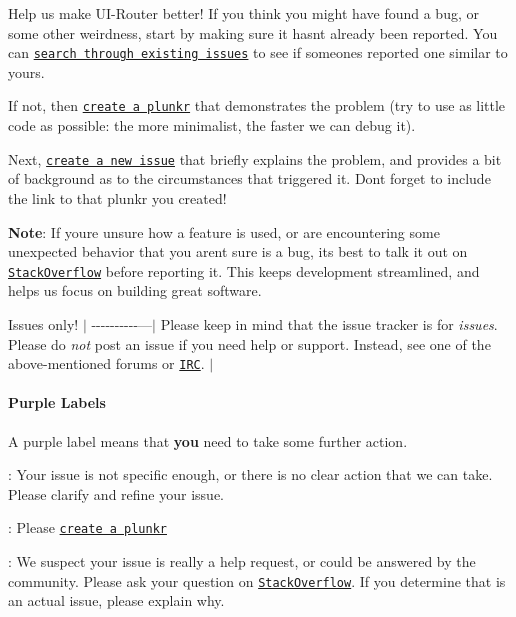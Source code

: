 Help us make U\+I-\/\+Router better! If you think you might have found a bug, or some other weirdness, start by making sure it hasn\textquotesingle{}t already been reported. You can \href{https://github.com/angular-ui/ui-router/search?q=wat%3F&type=Issues}{\tt search through existing issues} to see if someone\textquotesingle{}s reported one similar to yours.

If not, then \href{http://bit.ly/UIR-Plunk}{\tt create a plunkr} that demonstrates the problem (try to use as little code as possible\+: the more minimalist, the faster we can debug it).

Next, \href{https://github.com/angular-ui/ui-router/issues/new}{\tt create a new issue} that briefly explains the problem, and provides a bit of background as to the circumstances that triggered it. Don\textquotesingle{}t forget to include the link to that plunkr you created!

{\bfseries Note}\+: If you\textquotesingle{}re unsure how a feature is used, or are encountering some unexpected behavior that you aren\textquotesingle{}t sure is a bug, it\textquotesingle{}s best to talk it out on \href{http://stackoverflow.com/questions/ask?tags=angularjs,angular-ui-router}{\tt Stack\+Overflow} before reporting it. This keeps development streamlined, and helps us focus on building great software.

Issues only! $\vert$ -\/-\/-\/-\/-\/-\/-\/-\/-\/-\/---$\vert$ Please keep in mind that the issue tracker is for {\itshape issues}. Please do {\itshape not} post an issue if you need help or support. Instead, see one of the above-\/mentioned forums or \href{irc://irc.freenode.net/#angularjs}{\tt I\+RC}. $\vert$

\paragraph*{Purple Labels}

A purple label means that {\bfseries you} need to take some further action.
\begin{DoxyItemize}
\item \+: Your issue is not specific enough, or there is no clear action that we can take. Please clarify and refine your issue.
\item \+: Please \href{http://bit.ly/UIR-Plunk}{\tt create a plunkr}
\item \+: We suspect your issue is really a help request, or could be answered by the community. Please ask your question on \href{http://stackoverflow.com/questions/ask?tags=angularjs,angular-ui-router}{\tt Stack\+Overflow}. If you determine that is an actual issue, please explain why.
\end{DoxyItemize}

